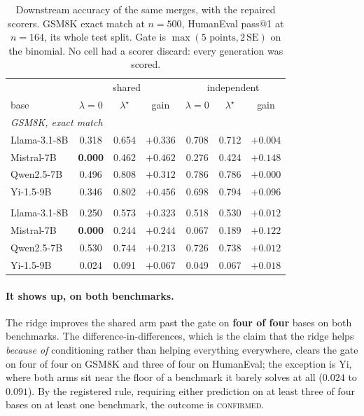 \begin{table}[t]
\centering
\small
\caption{Downstream accuracy of the same merges, with the repaired scorers.
GSM8K exact match at $n = 500$, HumanEval pass@1 at $n = 164$, its whole test
split. Gate is $\max(5\text{ points}, 2\,\mathrm{SE})$ on the binomial. No cell
had a scorer discard: every generation was scored.}
\label{tab:downstream-cond}
\begin{tabular}{lcccccc}
\toprule
& \multicolumn{3}{c}{shared} & \multicolumn{3}{c}{independent} \\
base & $\lambda{=}0$ & $\lambda^\star$ & gain
     & $\lambda{=}0$ & $\lambda^\star$ & gain \\
\midrule
\multicolumn{7}{l}{\emph{GSM8K, exact match}} \\
Llama-3.1-8B & 0.318 & 0.654 & $+0.336$ & 0.708 & 0.712 & $+0.004$ \\
Mistral-7B   & \textbf{0.000} & 0.462 & $+0.462$ & 0.276 & 0.424 & $+0.148$ \\
Qwen2.5-7B   & 0.496 & 0.808 & $+0.312$ & 0.786 & 0.786 & $+0.000$ \\
Yi-1.5-9B    & 0.346 & 0.802 & $+0.456$ & 0.698 & 0.794 & $+0.096$ \\
\addlinespace
\multicolumn{7}{l}{\emph{HumanEval, pass@1}} \\
Llama-3.1-8B & 0.250 & 0.573 & $+0.323$ & 0.518 & 0.530 & $+0.012$ \\
Mistral-7B   & \textbf{0.000} & 0.244 & $+0.244$ & 0.067 & 0.189 & $+0.122$ \\
Qwen2.5-7B   & 0.530 & 0.744 & $+0.213$ & 0.726 & 0.738 & $+0.012$ \\
Yi-1.5-9B    & 0.024 & 0.091 & $+0.067$ & 0.049 & 0.067 & $+0.018$ \\
\bottomrule
\end{tabular}
\end{table}

\paragraph{It shows up, on both benchmarks.} The ridge improves the shared arm
past the gate on \textbf{four of four} bases on both benchmarks. The
difference-in-differences, which is the claim that the ridge helps
\emph{because of} conditioning rather than helping everything everywhere,
clears the gate on four of four on GSM8K and three of four on HumanEval; the
exception is Yi, where both arms sit near the floor of a benchmark it barely
solves at all ($0.024$ to $0.091$). By the registered rule, requiring either
prediction on at least three of four bases on at least one benchmark, the
outcome is \textsc{confirmed}.

